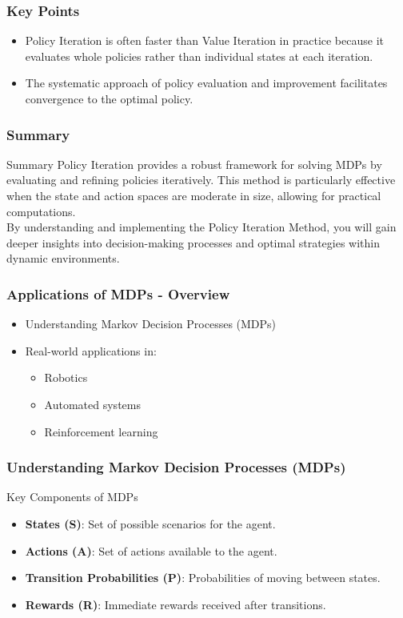 \documentclass[aspectratio=169]{beamer}
\begin{document}
\begin{frame}[fragile]
    \frametitle{Key Points}
    \begin{itemize}
        \item Policy Iteration is often faster than Value Iteration in practice because it evaluates whole policies rather than individual states at each iteration.
        \item The systematic approach of policy evaluation and improvement facilitates convergence to the optimal policy.
    \end{itemize}
\end{frame}

\begin{frame}[fragile]
    \frametitle{Summary}
    \begin{block}{Summary}
        Policy Iteration provides a robust framework for solving MDPs by evaluating and refining policies iteratively. This method is particularly effective when the state and action spaces are moderate in size, allowing for practical computations.
        \\
        By understanding and implementing the Policy Iteration Method, you will gain deeper insights into decision-making processes and optimal strategies within dynamic environments.
    \end{block}
\end{frame}

\begin{frame}[fragile]
    \frametitle{Applications of MDPs - Overview}
    \begin{itemize}
        \item Understanding Markov Decision Processes (MDPs)
        \item Real-world applications in:
        \begin{itemize}
            \item Robotics
            \item Automated systems
            \item Reinforcement learning
        \end{itemize}
    \end{itemize}
\end{frame}

\begin{frame}[fragile]
    \frametitle{Understanding Markov Decision Processes (MDPs)}
    \begin{block}{Key Components of MDPs}
        \begin{itemize}
            \item \textbf{States (S)}: Set of possible scenarios for the agent.
            \item \textbf{Actions (A)}: Set of actions available to the agent.
            \item \textbf{Transition Probabilities (P)}: Probabilities of moving between states.
            \item \textbf{Rewards (R)}: Immediate rewards received after transitions.
        \end{itemize}
    \end{block}
\end{frame}
\end{document}

